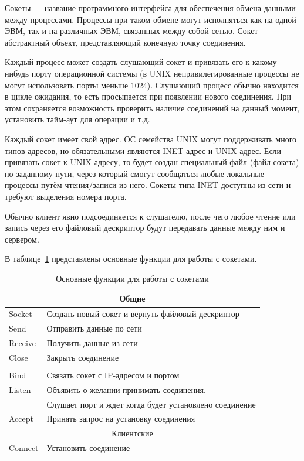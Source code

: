 Сокеты --- название программного интерфейса для обеспечения обмена данными между процессами. Процессы при таком обмене могут исполняться как на одной ЭВМ, так и на различных ЭВМ, связанных между собой сетью. Сокет --- абстрактный объект, представляющий конечную точку соединения.

Каждый процесс может создать слушающий сокет и привязать его к какому-нибудь порту операционной системы (в UNIX непривилегированные процессы не могут использовать порты меньше 1024). Слушающий процесс обычно находится в цикле ожидания, то есть просыпается при появлении нового соединения. При этом сохраняется возможность проверить наличие соединений на данный момент, установить тайм-аут для операции и т.д.

Каждый сокет имеет свой адрес. ОС семейства UNIX могут поддерживать много типов адресов, но обязательными являются INET-адрес и UNIX-адрес. Если привязать сокет к UNIX-адресу, то будет создан специальный файл (файл сокета) по заданному пути, через который смогут сообщаться любые локальные процессы путём чтения/записи из него. Сокеты типа INET доступны из сети и требуют выделения номера порта.

Обычно клиент явно подсоединяется к слушателю, после чего любое чтение или запись через его файловый дескриптор будут передавать данные между ним и сервером.

В таблице~\ref{tbl:2} представлены основные функции для работы с сокетами.

\captionsetup{justification=raggedleft,singlelinecheck=off}
\begin{table}[H]
	\centering
	\caption{Основные функции для работы с сокетами}
	\label{tbl:2}
	\begin{tabular}{|l|l|}
		\hline
		\multicolumn{2}{|c|}{Общие}	\\\hline
		Socket&	Создать новый сокет и вернуть файловый дескриптор\\\hline
		Send&	Отправить данные по сети\\\hline
		Receive&	Получить данные из сети\\\hline
		Close&	Закрыть соединение\\\hline
		
		\multicolumn{2}{|c|}{\centering{Серверные}}	\\\hline
		Bind&	Связать сокет с IP-адресом и портом\\\hline
		Listen&	Объявить о желании принимать соединения. \\&Слушает порт и ждет когда будет установлено соединение\\\hline
		Accept&	Принять запрос на установку соединения\\\hline
		
		\multicolumn{2}{|c|}{Клиентские}\\\hline
		Connect&	Установить соединение\\\hline
	\end{tabular}
\end{table}

